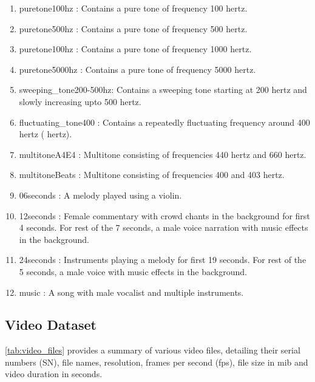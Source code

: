 \documentclass{ioereport}
\begin{document}
    \begin{enumerate}
        \item puretone100hz : Contains a pure tone of frequency 100 hertz.
        \item puretone500hz : Contains a pure tone of frequency 500 hertz.
        \item puretone100hz : Contains a pure tone of frequency 1000 hertz.
        \item puretone5000hz : Contains a pure tone of frequency 5000 hertz. 
        \item sweeping\_tone200-500hz: Contains a sweeping tone starting at 200 hertz and slowly increasing upto 500 hertz.
        \item fluctuating\_tone400 : Contains a repeatedly fluctuating frequency around 400 hertz ( hertz).
        \item multitoneA4E4 : Multitone consisting of frequencies 440 hertz and 660 hertz.
        \item multitoneBeats : Multitone consisting of frequencies 400 and 403 hertz.
        \item 06seconds : A melody played using a violin.
        \item 12seconds : Female commentary with crowd chants in the background for first 4 seconds. For rest of the 7 seconds, a male voice narration with music effects in the background.
        \item 24seconds : Instruments playing a melody for first 19 seconds. For rest of the 5 seconds, a male voice with music effects in the background.
        \item music : A song with male vocalist and multiple instruments.
        
    \end{enumerate}

\subsection{Video Dataset}

\autoref{tab:video_files} provides a summary of various video files, detailing their serial numbers (SN), file names, resolution, frames per second (fps), file size in \gls{mib} and video duration in seconds.
\end{document}
